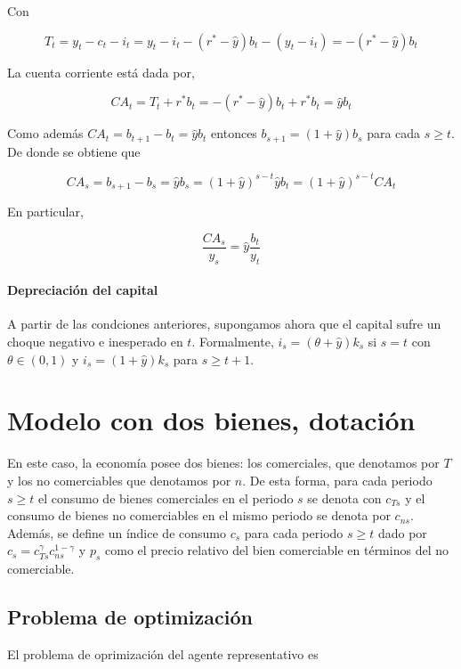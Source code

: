 \documentclass[]{article}
\let\oldparagraph\paragraph
\renewcommand{\paragraph}[1]{\oldparagraph{#1}\mbox{}}
\begin{document}
Con

\[
T_t = y_t-c_t-i_t = y_t - i_t - (r^*-\hat{y})b_t - (y_t - i_t) = -(r^*-\hat{y})b_t
\]

La cuenta corriente está dada por,

\[
CA_t = T_t + r^*b_t =  -(r^*-\hat{y})b_t + r^* b_t = \hat{y}b_t
\]

Como además \(CA_t = b_{t+1} - b_t = \hat{y} b_t\) entonces
\(b_{s+1} = (1+\hat{y})b_s\) para cada \(s \geq t\). De donde se obtiene
que

\[
CA_s = b_{s+1} - b_s = \hat{y}b_s = (1+\hat{y})^{s-t}\hat{y}b_t = (1+\hat{y})^{s-t}CA_t
\]

En particular,

\[
\frac{CA_s}{y_s} = \hat{y} \frac{b_t}{y_t}
\]

\paragraph{Depreciación del capital}\label{depreciacion-del-capital}

A partir de las condciones anteriores, supongamos ahora que el capital
sufre un choque negativo e inesperado en \(t\). Formalmente,
\(i_s =(\theta + \hat{y})k_s\) si \(s = t\) con \(\theta \in (0,1)\) y
\(i_s = (1 + \hat{y})k_s\) para \(s \geq t+1\).

\section{Modelo con dos bienes,
dotación}\label{modelo-con-dos-bienes-dotacion}

En este caso, la economía posee dos bienes: los comerciales, que
denotamos por \(T\) y los no comerciables que denotamos por \(n\). De
esta forma, para cada periodo \(s \geq t\) el consumo de bienes
comerciales en el periodo \(s\) se denota con \(c_{Ts}\) y el consumo de
bienes no comerciables en el mismo periodo se denota por \(c_{ns}\).
Además, se define un índice de consumo \(c_s\) para cada periodo
\(s \geq t\) dado por \(c_s = c_{Ts}^\gamma c_{ns}^{1-\gamma}\) y
\(p_s\) como el precio relativo del bien comerciable en términos del no
comerciable.

\subsection{Problema de optimización}\label{problema-de-optimizacion-4}

El problema de oprimización del agente representativo es
\end{document}
